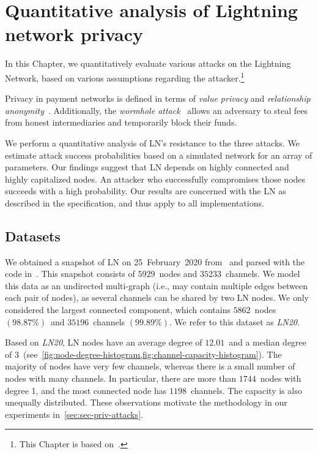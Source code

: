 \chapter{Quantitative analysis of Lightning network privacy}

\label{Chapter07LNattacks}

In this Chapter, we quantitatively evaluate various attacks on the Lightning Network, based on various assumptions regarding the attacker.\footnote{This Chapter is based on~\cite{Tikhomirov2020a}.}

Privacy in payment networks is defined in terms of \textit{value privacy} and \textit{relationship anonymity}~\cite{Malavolta2017}.
Additionally, the \textit{wormhole attack}~\cite{Malavolta2019} allows an adversary to steal fees from honest intermediaries and temporarily block their funds.

We perform a quantitative analysis of LN's resistance to the three attacks.
We estimate attack success probabilities based on a simulated network for an array of parameters.
Our findings suggest that LN depends on highly connected and highly capitalized nodes.
An attacker who successfully compromises those nodes succeeds with a high probability.
Our results are concerned with the LN as described in the specification, and thus apply to all implementations.


\section{Datasets}
\label{sec:datasets}

We obtained a snapshot of LN on 25~February~2020 from~\cite{fiatjaf2020} and parsed with the code in~\cite{Tikhomirov2019}.
This snapshot consists of $5929$~nodes and $35233$~channels.
We model this data as an undirected multi-graph (i.e., may contain multiple edges between each pair of nodes), as several channels can be shared by two LN nodes.
We only considered the largest connected component, which contains $5862$~nodes $(98.87\%)$~and $35196$~channels $(99.89\%)$.
We refer to this dataset as \emph{LN20}.

Based on \emph{LN20}, 
LN nodes have an average degree of $12.01$~and a median degree of $3$~(see~\cref{fig:node-degree-histogram,fig:channel-capacity-histogram}).
The majority of nodes have very few channels, 
whereas there is a small number of nodes with many channels.
In particular, there are more than $1744$~nodes with degree 1, and the most connected node has $1198$~channels.
The capacity is also unequally distributed.
These observations motivate the methodology in our experiments in~\cref{sec:sec-priv-attacks}.

